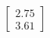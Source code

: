 \documentclass[preview]{standalone}
\begin{document}
\begin{align*}
\begin{bmatrix} 2.75 \\ 3.61 \end{bmatrix}
\end{align*}
\end{document}
